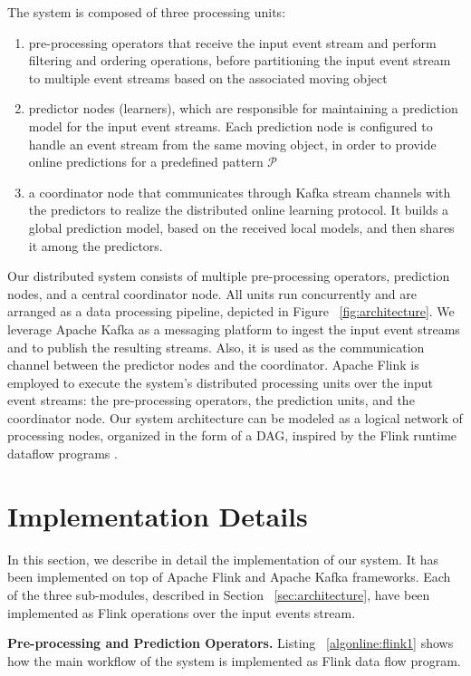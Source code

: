 The system is composed of three processing units:   \begin{enumerate}[]
	\item pre-processing operators that receive the input event stream and perform filtering and ordering operations, before partitioning the input event stream to multiple event streams based on the associated moving object 
	\item predictor nodes (learners), which are responsible for maintaining a prediction model for the input event streams. Each prediction node is configured to handle an event stream from the same moving object, in order to provide online predictions for a predefined pattern $\mathcal{P}$  
	\item a coordinator node that communicates through Kafka stream channels with the predictors to realize the distributed online learning protocol. It builds a global prediction model, based on the received local models, and then shares it among the predictors.
\end{enumerate}

\par Our distributed system consists of multiple pre-processing operators, prediction nodes, and a central coordinator node. All units run concurrently and are arranged as a  data processing pipeline, depicted in Figure ~\ref{fig:architecture}. We leverage Apache Kafka as a messaging platform to ingest the input event streams and to publish the resulting streams. Also, it is used as the communication channel between the predictor nodes and the coordinator. Apache Flink is employed to execute the system's distributed processing units over the input event streams: the pre-processing operators,  the prediction units, and the coordinator node. Our system architecture can be modeled as a logical network of processing nodes, organized in the form of a DAG, inspired by the Flink runtime dataflow programs \cite{carbone2015apache}. 

\section{Implementation Details}
\label{sec:impl}
In this section, we describe in detail the implementation of our system. It has been implemented on top of Apache Flink and Apache Kafka frameworks. Each of the three sub-modules, described in Section ~\ref{sec:architecture}, have been implemented as Flink operations over the input events stream. 

\textbf{Pre-processing and Prediction Operators.} Listing ~\ref{algonline:flink1} shows how the main workflow of the system is implemented as Flink data flow program.

